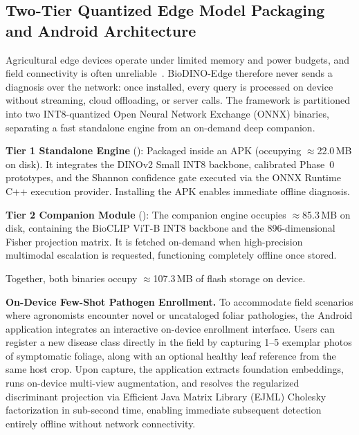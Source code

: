 \documentclass[preprint,12pt]{elsarticle}
\begin{document}
\subsection{Two-Tier Quantized Edge Model Packaging and Android Architecture}
\label{sec:packaging}
Agricultural edge devices operate under limited memory and power budgets, and field connectivity is often unreliable~\cite{sharif2026real,radocaj2025evolution}. BioDINO-Edge therefore never sends a diagnosis over the network: once installed, every query is processed on device without streaming, cloud offloading, or server calls. The framework is partitioned into two INT8-quantized Open Neural Network Exchange (ONNX) binaries, separating a fast standalone engine from an on-demand deep companion.

\textbf{Tier 1 Standalone Engine} (): Packaged inside an APK (occupying $\approx$22.0\,MB on disk). It integrates the DINOv2 Small INT8 backbone, calibrated Phase~0 prototypes, and the Shannon confidence gate executed via the ONNX Runtime C++ execution provider. Installing the APK enables immediate offline diagnosis.

\textbf{Tier 2 Companion Module} (): The companion engine occupies $\approx$85.3\,MB on disk, containing the BioCLIP ViT-B INT8 backbone and the 896-dimensional Fisher projection matrix. It is fetched on-demand when high-precision multimodal escalation is requested, functioning completely offline once stored.

Together, both binaries occupy $\approx$107.3\,MB of flash storage on device.

\textbf{On-Device Few-Shot Pathogen Enrollment.} To accommodate field scenarios where agronomists encounter novel or uncataloged foliar pathologies, the Android application integrates an interactive on-device enrollment interface. Users can register a new disease class directly in the field by capturing 1--5 exemplar photos of symptomatic foliage, along with an optional healthy leaf reference from the same host crop. Upon capture, the application extracts foundation embeddings, runs on-device multi-view augmentation, and resolves the regularized discriminant projection via Efficient Java Matrix Library (EJML) Cholesky factorization in sub-second time, enabling immediate subsequent detection entirely offline without network connectivity.

\end{document}
